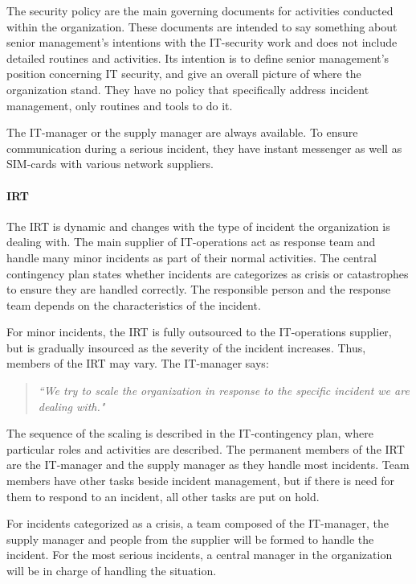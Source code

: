 The security policy are the main governing documents for activities conducted within the organization. These documents are intended to say something about senior management's intentions with the IT-security work and does not include detailed routines and activities. Its intention is to define senior management's position concerning IT security, and give an overall picture of where the organization stand. They have no policy that specifically address incident management, only routines and tools to do it.

The IT-manager or the supply manager are always available. To ensure communication during a serious incident, they have instant messenger as well as SIM-cards with various network suppliers. 

\paragraph{\acl{IRT}}
The \ac{IRT} is dynamic and changes with the type of incident the organization is dealing with. The main supplier of IT-operations act as response team and handle many minor incidents as part of their normal activities. The central contingency plan states whether incidents are categorizes as crisis or catastrophes to ensure they are handled correctly. The responsible person and the response team depends on the characteristics of the incident.   

For minor incidents, the \ac{IRT} is fully outsourced to the IT-operations supplier, but is gradually insourced as the severity of the incident increases. Thus, members of the \ac{IRT} may vary. The IT-manager says:
\begin{quote}
\textit{``We try to scale the organization in response to the specific incident we are dealing with."}
\end{quote}

The sequence of the scaling is described in the IT-contingency plan, where particular roles and activities are described. The permanent members of the \ac{IRT} are the IT-manager and the supply manager as they handle most incidents. Team members have other tasks beside incident management, but if there is need for them to respond to an incident, all other tasks are put on hold.

For incidents categorized as a crisis, a team composed of the IT-manager, the supply manager and people from the supplier will be formed to handle the incident. For the most serious incidents, a central manager in the organization will be in charge of handling the situation.

